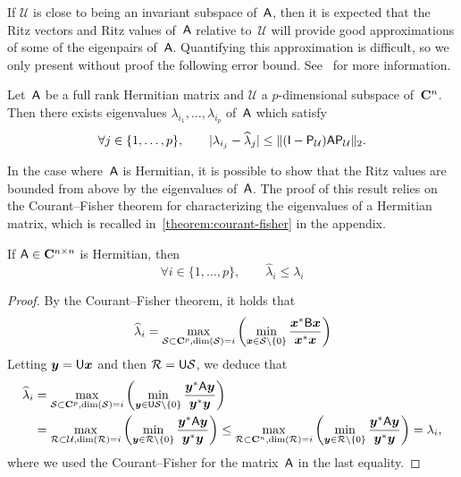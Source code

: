 If $\mathcal U$ is close to being an invariant subspace of~$\mathsf A$,
then it is expected that the Ritz vectors and Ritz values of~$\mathsf A$ relative to~$\mathcal U$ will provide good approximations of some of the eigenpairs of~$\mathsf A$.
Quantifying this approximation is difficult,
so we only present without proof the following error bound.
See~\cite{MR1990645} for more information.
\begin{proposition}
    Let~$\mathsf A$ be a full rank Hermitian matrix and $\mathcal U$ a $p$-dimensional subspace of~$\mathbf C^n$.
    Then there exists eigenvalues $\lambda_{i_1}, \dotsc, \lambda_{i_p}$ of~$\mathsf A$ which satisfy
    \[
        \forall j \in \{1, \dotsc, p\}, \qquad
        \lvert\lambda_{i_j} - \widehat \lambda_j\rvert \leq \lVert(\mathsf I - \mathsf P_{\mathcal U}) \mathsf A \mathsf P_{\mathcal U}\rVert_2.
    \]
\end{proposition}

In the case where~$\mathsf A$ is Hermitian,
it is possible to show that the Ritz values are bounded from above by the eigenvalues of~$\mathsf A$.
The proof of this result relies on the Courant--Fisher theorem for characterizing the eigenvalues of a Hermitian matrix,
which is recalled in~\cref{theorem:courant-fisher} in the appendix.
\begin{proposition}
    If $\mathsf A \in \mathbf C^{n \times n}$ is Hermitian,
    then
    \[
        \forall i \in \{1, \dotsc, p\}, \qquad
        \widehat \lambda_i \leq \lambda_i
    \]
\end{proposition}
\begin{proof}
By the Courant--Fisher theorem,
it holds that
\[
    \widehat \lambda_i
    = \max_{\mathcal S \subset \mathbf C^p, {\rm dim}(\mathcal S) = i} \left( \min_{\mathbf{\boldsymbol{x}} \in \mathcal S \backslash\{0\}} \frac{\mathbf{\boldsymbol{x}}^* \mathsf B \mathbf{\boldsymbol{x}}}{\mathbf{\boldsymbol{x}}^* \mathbf{\boldsymbol{x}}} \right)
\]
Letting $\mathbf{\boldsymbol{y}} = \mathsf U \mathbf{\boldsymbol{x}}$ and then $\mathcal R = \mathsf U \mathcal S$,
we deduce that
\begin{align*}
    \widehat \lambda_i
    &= \max_{\mathcal S \subset \mathbf C^p, {\rm dim}(\mathcal S) = i} \left( \min_{\mathbf{\boldsymbol{y}} \in \mathsf U \mathcal S \backslash\{0\}} \frac{\mathbf{\boldsymbol{y}}^* \mathsf A \mathbf{\boldsymbol{y}}}{\mathbf{\boldsymbol{y}}^* \mathbf{\boldsymbol{y}}} \right) \\
    &= \max_{\mathcal R \subset \mathcal U, {\rm dim}(\mathcal R) = i} \left( \min_{\mathbf{\boldsymbol{y}} \in \mathcal R \backslash\{0\}} \frac{\mathbf{\boldsymbol{y}}^* \mathsf A \mathbf{\boldsymbol{y}}}{\mathbf{\boldsymbol{y}}^* \mathbf{\boldsymbol{y}}} \right)
    \leq \max_{\mathcal R \subset \mathbf C^n, {\rm dim}(\mathcal R) = i} \left( \min_{\mathbf{\boldsymbol{y}} \in \mathcal R \backslash\{0\}} \frac{\mathbf{\boldsymbol{y}}^* \mathsf A \mathbf{\boldsymbol{y}}}{\mathbf{\boldsymbol{y}}^* \mathbf{\boldsymbol{y}}} \right) = \lambda_i,
\end{align*}
where we used the Courant--Fisher for the matrix~$\mathsf A$ in the last equality.
\end{proof}

